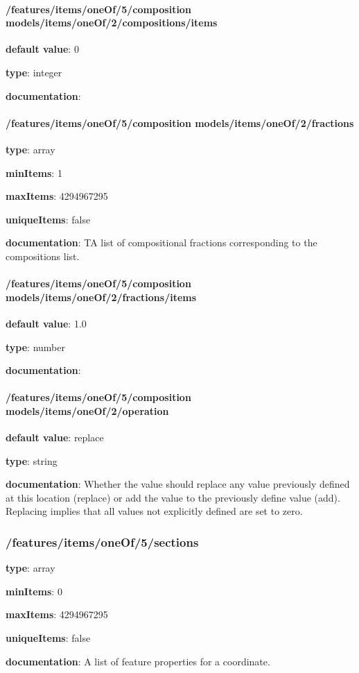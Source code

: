 \begin{itemized}
\paragraph{/features/items/oneOf/5/composition models/items/oneOf/2/compositions/items} \begin{itemized}
\item {\bf default value}: 0
\item {\bf type}: integer
\item {\bf documentation}: 
\end{itemized}\end{itemized}\paragraph{/features/items/oneOf/5/composition models/items/oneOf/2/fractions} \begin{itemized}
\item {\bf type}: array
\item {\bf minItems}: 1
\item {\bf maxItems}: 4294967295
\item {\bf uniqueItems}: false
\item {\bf documentation}: TA list of compositional fractions corresponding to the compositions list.
\paragraph{/features/items/oneOf/5/composition models/items/oneOf/2/fractions/items} \begin{itemized}
\item {\bf default value}: 1.0
\item {\bf type}: number
\item {\bf documentation}: 
\end{itemized}\end{itemized}\paragraph{/features/items/oneOf/5/composition models/items/oneOf/2/operation} \begin{itemized}
\item {\bf default value}: replace
\item {\bf type}: string
\item {\bf documentation}: Whether the value should replace any value previously defined at this location (replace) or add the value to the previously define value (add). Replacing implies that all values not explicitly defined are set to zero.
\end{itemized}\subsubsection{/features/items/oneOf/5/sections} \begin{itemized}
\item {\bf type}: array
\item {\bf minItems}: 0
\item {\bf maxItems}: 4294967295
\item {\bf uniqueItems}: false
\item {\bf documentation}: A list of feature properties for a coordinate.

\end{itemized}
